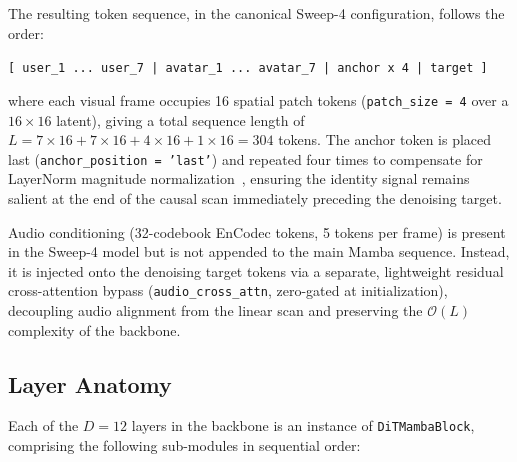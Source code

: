 \documentclass[12pt,letterpaper]{report}
\begin{document}
The resulting token sequence, in the canonical Sweep-4 configuration, follows the order:
\begin{center}
    \texttt{[ user\_1 ... user\_7 | avatar\_1 ... avatar\_7 | anchor x 4 | target ]}
\end{center}
where each visual frame occupies 16 spatial patch tokens (\texttt{patch\_size = 4} over a $16 \times 16$ latent), giving a total sequence length of $L = 7 \times 16 + 7 \times 16 + 4 \times 16 + 1 \times 16 = 304$ tokens. The anchor token is placed last (\texttt{anchor\_position = 'last'}) and repeated four times to compensate for LayerNorm magnitude normalization~\cite{ba2016layer}, ensuring the identity signal remains salient at the end of the causal scan immediately preceding the denoising target.

Audio conditioning (32-codebook EnCodec tokens, 5 tokens per frame) is present in the Sweep-4 model but is not appended to the main Mamba sequence. Instead, it is injected onto the denoising target tokens via a separate, lightweight residual cross-attention bypass (\texttt{audio\_cross\_attn}, zero-gated at initialization), decoupling audio alignment from the linear scan and preserving the $\mathcal{O}(L)$ complexity of the backbone.

\subsection{Layer Anatomy}

Each of the $D=12$ layers in the backbone is an instance of \texttt{DiTMambaBlock},
comprising the following sub-modules in sequential order: %
\end{document}
